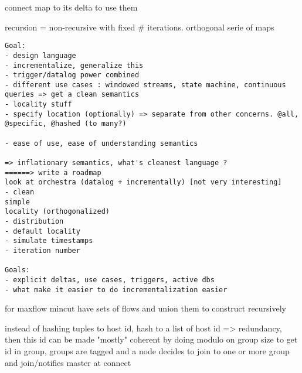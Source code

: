 \documentclass[10pt]{article}
\begin{document}
connect map to its delta to use them

recursion = non-recursive with fixed \# iterations. orthogonal serie of maps

\begin{verbatim}
Goal:
- design language
- incrementalize, generalize this
- trigger/datalog power combined
- different use cases : windowed streams, state machine, continuous queries => get a clean semantics
- locality stuff
- specify location (optionally) => separate from other concerns. @all, @specific, @hashed (to many?)

- ease of use, ease of understanding semantics

=> inflationary semantics, what's cleanest language ?
======> write a roadmap
look at orchestra (datalog + incrementally) [not very interesting]
- clean
simple
locality (orthogonalized)
- distribution
- default locality
- simulate timestamps
- iteration number

Goals:
- explicit deltas, use cases, triggers, active dbs
- what make it easier to do incrementalization easier
\end{verbatim}


for maxflow mincut have sets of flows and union them to construct recursively

instead of hashing tuples to host id, hash to a list of host id => redundancy, then this id can be made "mostly" coherent by doing modulo on group size to get id in group, groups are tagged and a node decides to join to one or more group and join/notifies master at connect
\end{document}
